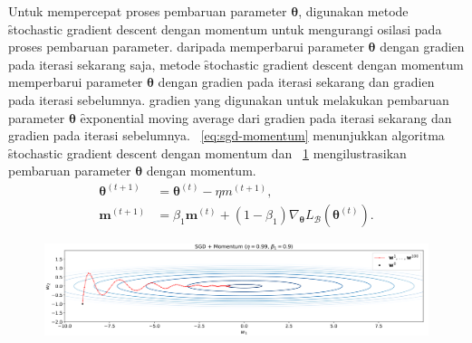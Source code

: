 Untuk mempercepat proses pembaruan parameter $\bm{\theta}$, digunakan metode \f{stochastic gradient descent} dengan momentum untuk mengurangi osilasi pada proses pembaruan parameter. daripada memperbarui parameter $\bm{\theta}$ dengan gradien pada iterasi sekarang saja, metode \f{stochastic gradient descent} dengan momentum memperbarui parameter $\bm{\theta}$ dengan gradien pada iterasi sekarang dan gradien pada iterasi sebelumnya. gradien yang digunakan untuk melakukan pembaruan parameter $\bm{\theta}$ \f{exponential moving average} dari gradien pada iterasi sekarang dan gradien pada iterasi sebelumnya. \equ~\ref{eq:sgd-momentum} menunjukkan algoritma \f{stochastic gradient descent} dengan momentum dan \pic~\ref{fig:sgd-momentum} mengilustrasikan pembaruan parameter $\bm{\theta}$ dengan momentum.
\begin{align}
    \label{eq:sgd-momentum}
    \bm{\theta}^{(t+1)} &= \bm{\theta}^{(t)} - \eta m^{(t+1)}, \\
    \bm{m}^{(t+1)} &= \beta_1 \bm{m}^{(t)} + (1 - \beta_1) \nabla_{\bm{\theta}} L_{\mathcal{B}}(\bm{\theta}^{(t)}).
\end{align}
\begin{figure}
    \centering
    \includegraphics[width=1\textwidth]{assets/pics/sgd-momentum.png}
    \label{fig:sgd-momentum}
\end{figure}

